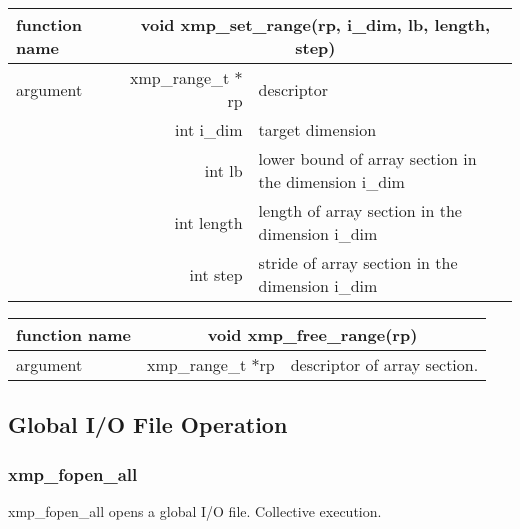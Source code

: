   \begin{table}[h]
    \begin{center}
      \begin{tabular}{|l|r|p{90mm}|}
      \hline
          {\bf function name}  & \multicolumn{2}{c|}{\bf void xmp\_set\_range(rp, i\_dim, lb, length, step)}  \\ \hline \hline
          argument & xmp\_range\_t $*$rp  & descriptor \\ \cline{2-3}
          & int i\_dim & target dimension \\ \cline{2-3}
          & int lb & lower bound of array section in the dimension i\_dim \\ \cline{2-3}
          & int length & length of array section in the dimension i\_dim \\ \cline{2-3}
          & int step & stride of array section in the dimension i\_dim \\ \hline
      \end{tabular}
     \end{center}
    \label{tb:aaa}
   \end{table}
\clearpage
   \begin{table}[h]
    \begin{center}
      \begin{tabular}{|l|r|p{90mm}|}
      \hline
      {\bf function name}  & \multicolumn{2}{c|}{\bf void xmp\_free\_range(rp)}  \\ \hline \hline
      argument & xmp\_range\_t $*$rp & descriptor of array section. \\ \hline
      \end{tabular}
     \end{center}
    \label{tb:aaa}
   \end{table}
   
   \subsection{Global I/O File Operation}

   \subsubsection{xmp\_fopen\_all}
   xmp\_fopen\_all opens a global I/O file. Collective execution.
   
